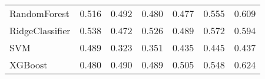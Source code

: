 \begin{tabular}{lllllll}
                   RandomForest & 0.516 &                     0.492 &                 0.480 &                  0.477 &                                   0.555 &     0.609 \\
                RidgeClassifier & 0.538 &                     0.472 &                 0.526 &                  0.489 &                                   0.572 &     0.594 \\
                            SVM & 0.489 &                     0.323 &                 0.351 &                  0.435 &                                   0.445 &     0.437 \\
                        XGBoost & 0.480 &                     0.490 &                 0.489 &                  0.505 &                                   0.548 &     0.624 \\
\bottomrule
\end{tabular}
